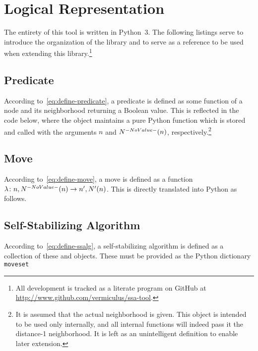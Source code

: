 \section{Logical Representation}
\label{sec:logic-repr}

The entirety of this tool is written in Python~3.
The following listings serve to introduce the organization of the library and
  to serve as a reference to be used when extending this library.\footnote{%
    All development is tracked as a literate program on GitHub
    at \url{http://www.github.com/vermiculus/ssa-tool}.}

\subsection{Predicate}
\label{sec:logic-repr:predicate}

According to~\eqref{eq:define-predicate},
  a \gls{predicate} is defined as some function of
  a node and its neighborhood returning a Boolean value.
This is reflected in the code below,
  where the  object maintains a pure Python function
  which is stored and called with the arguments $n$ and $\OpenNeighborhood{n}$,
  respectively.\footnote{%
    It is assumed that the actual neighborhood is given.
    This object is intended to be used only internally,
      and all internal functions will indeed pass it the distance-1 neighborhood.
    It is left as an unintelligent definition to enable later extension.}


\subsection{Move}
\label{sec:logic-repr:move}

According to~\eqref{eq:define-move},
  a \gls{move} is defined as a function
  $\Function{n, \OpenNeighborhood{n}}{n^\prime, \OpenNeighborhood[\prime]{n}}$.
This is directly translated into Python as follows.


\subsection{Self-Stabilizing Algorithm}
\label{sec:logic-repr:self-stab-algor}

According to~\eqref{eq:define-ssalg},
  a self-stabilizing algorithm is defined as a collection
  of these  and  objects.
These must be provided as the Python dictionary \lstinline|moveset|


